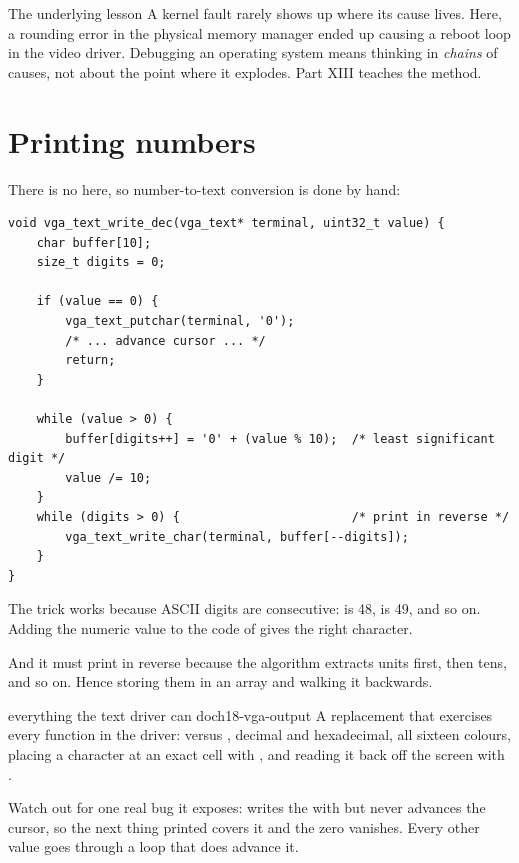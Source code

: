 \begin{concept}{The underlying lesson}
A kernel fault rarely shows up where its cause lives. Here, a rounding error in the physical memory
manager ended up causing a reboot loop in the video driver. Debugging an operating system means
thinking in \emph{chains} of causes, not about the point where it explodes. Part XIII teaches the
method.
\end{concept}

\section{Printing numbers}

There is no  here, so number-to-text conversion is done by hand:

\begin{lstlisting}[style=c]
void vga_text_write_dec(vga_text* terminal, uint32_t value) {
    char buffer[10];
    size_t digits = 0;

    if (value == 0) {
        vga_text_putchar(terminal, '0');
        /* ... advance cursor ... */
        return;
    }

    while (value > 0) {
        buffer[digits++] = '0' + (value % 10);  /* least significant digit */
        value /= 10;
    }
    while (digits > 0) {                        /* print in reverse */
        vga_text_write_char(terminal, buffer[--digits]);
    }
}
\end{lstlisting}

The  trick works because ASCII digits are consecutive:  is 48, 
is 49, and so on. Adding the numeric value to the code of  gives the right character.

And it must print in reverse because the algorithm extracts units first, then tens, and so on. Hence
storing them in an array and walking it backwards.

\begin{recipe}{everything the text driver can do}{ch18-vga-output}
A replacement  that exercises every function in the driver:
 versus , decimal and hexadecimal, all sixteen colours, placing a
character at an exact cell with , and reading it back off the screen
with .

Watch out for one real bug it exposes:  writes the  with
 but never advances the cursor, so the next thing printed covers it and the zero
vanishes. Every other value goes through a loop that does advance it.
\end{recipe}



